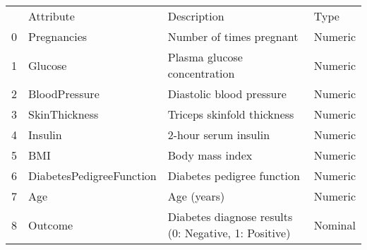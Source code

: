 \begin{tabular}{llll}
 & Attribute & Description & Type \\
0 & Pregnancies & Number of times pregnant & Numeric \\
1 & Glucose & Plasma glucose concentration & Numeric \\
2 & BloodPressure & Diastolic blood pressure & Numeric \\
3 & SkinThickness & Triceps skinfold thickness & Numeric \\
4 & Insulin & 2-hour serum insulin & Numeric \\
5 & BMI & Body mass index & Numeric \\
6 & DiabetesPedigreeFunction & Diabetes pedigree function & Numeric \\
7 & Age & Age (years) & Numeric \\
8 & Outcome & Diabetes diagnose results (0: Negative, 1: Positive) & Nominal \\
\end{tabular}
